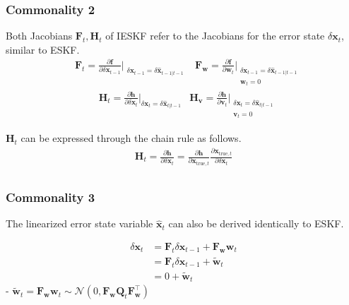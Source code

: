 \documentclass[10pt]{article}
\begin{document}
\subsubsection{Commonality 2}
Both Jacobians $\mathbf{F}_{t}, \mathbf{H}_{t}$ of IESKF refer to the Jacobians for the error state $\delta \mathbf{x}_{t}$, similar to ESKF.
\begin{equation}   \boxed { \begin{aligned}
			& \mathbf{F}_{t} = \frac{\partial \mathbf{f}} {\partial \delta \mathbf{x}_{t-1}}\bigg|_{\substack{ \delta \mathbf{x}_{t-1} = \delta \hat{\mathbf{x}}_{t-1|t-1} }} & \mathbf{F}_{\mathbf{w}}  = \frac{\partial \mathbf{f}} {\partial \mathbf{w}_{t}}\bigg|_{\substack{ \delta \mathbf{x}_{t-1} = \delta \hat{\mathbf{x}}_{t-1|t-1} \\  \mathbf{w}_{t}=0}}
	\end{aligned} }
\end{equation}
\begin{equation}
	\boxed{ \begin{aligned}
			& \mathbf{H}_{t} = \frac{\partial \mathbf{h}}{\partial \delta \mathbf{x}_{t}}\bigg|_{\delta \mathbf{x}_{t}= \delta  \hat{\mathbf{x}}_{t|t-1}}  & \mathbf{H}_{\mathbf{v}} = \frac{\partial \mathbf{h}}{\partial \mathbf{v}_{t}}\bigg|_{ \substack{  \delta \mathbf{x}_{t}= \delta \hat{\mathbf{x}}_{t|t-1} \\  \mathbf{v}_{t}=0 }}
	\end{aligned} }
\end{equation}

$\mathbf{H}_{t}$ can be expressed through the chain rule as follows.
\begin{equation} 
	\begin{aligned} 
		\mathbf{H}_{t} = \frac{\partial \mathbf{h}}{\partial \delta \mathbf{x}_{t}} = \frac{\partial \mathbf{h}}{\partial \mathbf{x}_{\text{true},t}} \frac{\partial \mathbf{x}_{\text{true},t}}{\partial \delta \mathbf{x}_{t}} \\
	\end{aligned} 
\end{equation}

\subsubsection{Commonality 3}
The linearized error state variable $\hat{\mathbf{x}}_{t}$ can also be derived identically to ESKF.

\begin{equation} 
	\boxed { \begin{aligned} 
			\delta \mathbf{x}_{t} & = \mathbf{F}_{t} \delta \mathbf{x}_{t-1}  + \mathbf{F}_{\mathbf{w}} \mathbf{w}_{t} \\ 
			& = \mathbf{F}_{t} \delta \mathbf{x}_{t-1} +  \tilde{\mathbf{w}}_{t} \\ 
			& = 0 + \tilde{\mathbf{w}}_{t}
	\end{aligned}  }
\end{equation}
- $\tilde{\mathbf{w}}_{t} = \mathbf{F}_{\mathbf{w}} \mathbf{w}_{t} \sim \mathcal{N}(0, \mathbf{F}_{\mathbf{w}}\mathbf{Q}_{t} \mathbf{F}_{\mathbf{w}}^{\intercal})$\\
\end{document}
